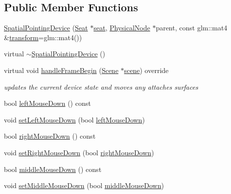 \subsection*{Public Member Functions}
\begin{DoxyCompactItemize}
\item 
\hyperlink{classmotorcar_1_1SpatialPointingDevice_ada65b16015ff1a5564c0439c5c8f5927}{Spatial\-Pointing\-Device} (\hyperlink{classmotorcar_1_1Seat}{Seat} $\ast$\hyperlink{classmotorcar_1_1SpatialPointingDevice_ae99e25b875cbdd20f48195cbeedb561f}{seat}, \hyperlink{classmotorcar_1_1PhysicalNode}{Physical\-Node} $\ast$parent, const glm\-::mat4 \&\hyperlink{classmotorcar_1_1SceneGraphNode_ad96e79fdd739ac8223a3128003be391a}{transform}=glm\-::mat4())
\item 
virtual \hyperlink{classmotorcar_1_1SpatialPointingDevice_a2232e5d48af72563948b3dcf87467ba4}{$\sim$\-Spatial\-Pointing\-Device} ()
\item 
virtual void \hyperlink{classmotorcar_1_1SpatialPointingDevice_ad92e0dfb793700dd9b332cecd38a1587}{handle\-Frame\-Begin} (\hyperlink{classmotorcar_1_1Scene}{Scene} $\ast$\hyperlink{classmotorcar_1_1SceneGraphNode_aa14e637ed4ae98f77e28941a4b5cfdd8}{scene}) override
\begin{DoxyCompactList}\small\item\em updates the current device state and moves any attaches surfaces \end{DoxyCompactList}\item 
bool \hyperlink{classmotorcar_1_1SpatialPointingDevice_a00473664d02c3adc6636515d328115d8}{left\-Mouse\-Down} () const 
\item 
void \hyperlink{classmotorcar_1_1SpatialPointingDevice_a8d5fb9adf62c0c808c9c08369206d47a}{set\-Left\-Mouse\-Down} (bool \hyperlink{classmotorcar_1_1SpatialPointingDevice_a00473664d02c3adc6636515d328115d8}{left\-Mouse\-Down})
\item 
bool \hyperlink{classmotorcar_1_1SpatialPointingDevice_ae419894256240b9815dd88675be03f00}{right\-Mouse\-Down} () const 
\item 
void \hyperlink{classmotorcar_1_1SpatialPointingDevice_a260a837c910d3e640df05b63b44c052e}{set\-Right\-Mouse\-Down} (bool \hyperlink{classmotorcar_1_1SpatialPointingDevice_ae419894256240b9815dd88675be03f00}{right\-Mouse\-Down})
\item 
bool \hyperlink{classmotorcar_1_1SpatialPointingDevice_aa41dd8386cb72b3813f54af4175f8bd3}{middle\-Mouse\-Down} () const 
\item 
void \hyperlink{classmotorcar_1_1SpatialPointingDevice_ac582041efeac1940a72ddc33e352101e}{set\-Middle\-Mouse\-Down} (bool \hyperlink{classmotorcar_1_1SpatialPointingDevice_aa41dd8386cb72b3813f54af4175f8bd3}{middle\-Mouse\-Down})

\end{DoxyCompactItemize}
